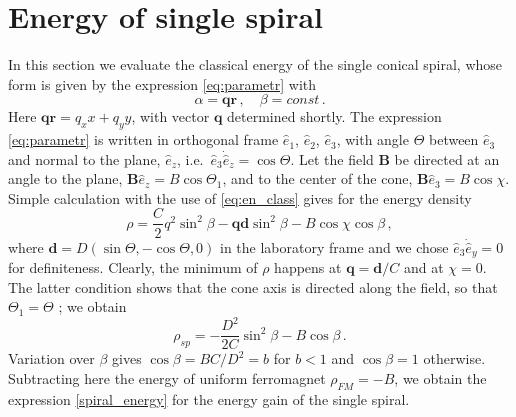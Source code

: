 \documentclass[aps,prb,twocolumn,superscriptaddress,nobalancelastpage]{revtex4-1}
\begin{document}
\section{\label{app:spiral}  Energy of single spiral}

In this section we evaluate the classical energy of the single conical spiral, whose form is given by the expression \eqref{eq:parametr} with 
\begin{equation}
\alpha = \mathbf{qr} \,,\quad \beta = const \,.
\end{equation}
Here  $\mathbf{qr} =  q_{x}x +  q_{y}y$, with vector $\mathbf{q}$ determined shortly.  
The expression \eqref{eq:parametr}  is written in orthogonal frame $\hat e_{1}$,  $\hat e_{2}$,  $\hat e_{3}$, with angle $\Theta$ between $\hat e_{3}$ and normal to the plane, $\hat e_{z}$,  i.e.\  $\hat e_{3} \dot \hat e_{z} = \cos \Theta$.  Let the field $\mathbf{B}$ be directed at an angle to the plane, $\mathbf{B} \hat e_{z} = B \cos \Theta_{1} $, and to the center of the cone, $\mathbf{B} \hat e_{3} = B \cos \chi $. Simple calculation with the use of  \eqref{eq:en_class} gives for the energy density 
\begin{equation}
\rho = \frac{C}2   q^{2} \sin^{2}\beta - \mathbf{qd}   \sin^{2}\beta - B \cos\chi \cos \beta \,,
\end{equation}
where $\mathbf{d} = D( \sin \Theta, - \cos\Theta, 0 )$ in the laboratory frame 
and we chose $\hat e_{3} \dot \hat e_{y} = 0$ for definiteness.  Clearly, the minimum of $\rho$ happens at $\mathbf {q}=   \mathbf{d}/C$ and at   $\chi =0$. The latter condition shows that the cone axis is directed along the field, so that $\Theta_{1}= \Theta$ ;  we obtain
\begin{equation}
\rho_{sp} =  - \frac{D^{2}}{2C}  \sin^{2}\beta - B  \cos \beta \,.
\end{equation}
Variation over $\beta$ gives $\cos\beta = BC/D^{2} = b $ for $b<1$ and $\cos\beta=1$ otherwise.
Subtracting here the energy of uniform ferromagnet $\rho_{FM} = -B$, we obtain the  expression \eqref{spiral_energy} for the energy gain of the single spiral.
\cite{Maleyev2006}
 

\end{document}
